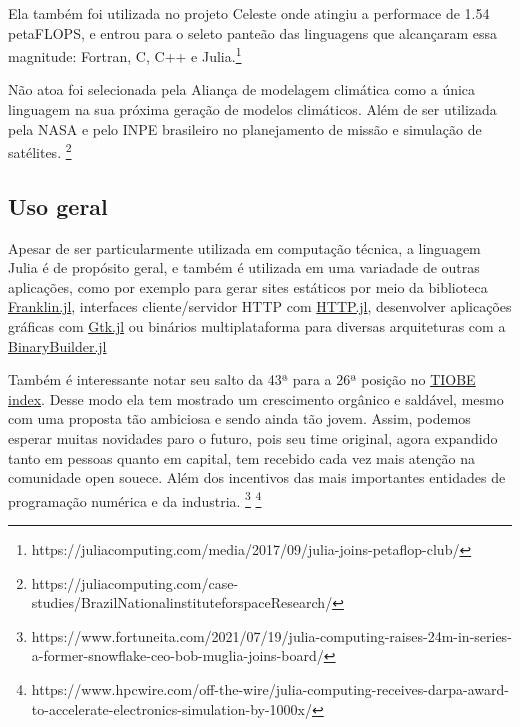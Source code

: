 Ela também foi utilizada no projeto Celeste onde atingiu a performace de 1.54 petaFLOPS, e entrou para o seleto panteão das linguagens que alcançaram essa magnitude: Fortran, C, C++ e Julia.\footnote{https://juliacomputing.com/media/2017/09/julia-joins-petaflop-club/}

Não atoa foi selecionada pela Aliança de modelagem climática como a única linguagem na sua próxima geração de modelos climáticos. Além de ser utilizada pela NASA e pelo INPE brasileiro no planejamento de missão e simulação de satélites. \footnote{https://juliacomputing.com/case-studies/BrazilNationalinstituteforspaceResearch/}



\subsection{Uso geral}

Apesar de ser particularmente utilizada em computação técnica, a linguagem Julia é de propósito geral, e também é utilizada em uma variadade de outras aplicações, como por exemplo para gerar sites estáticos por meio da biblioteca \href{http://franklinjl.org/)}{Franklin.jl}, interfaces cliente/servidor HTTP com \href{https://github.com/JuliaWeb/HTTP.jl}{HTTP.jl}, desenvolver aplicações gráficas com \href{https://github.com/JuliaGraphics/Gtk.jl}{Gtk.jl} ou binários multiplataforma para diversas arquiteturas com a \href{http://binarybuilder.org/}{BinaryBuilder.jl}

Também é interessante notar seu salto da 43ª para a 26ª posição no \href{https://www.tiobe.com/tiobe-index/}{TIOBE index}. 
Desse modo ela tem mostrado um crescimento orgânico e saldável, mesmo com uma proposta tão ambiciosa e sendo ainda tão jovem. Assim, podemos esperar muitas novidades paro o futuro, pois seu time original, agora expandido tanto em pessoas quanto em capital, tem recebido cada vez mais atenção na comunidade open souece. Além dos incentivos das mais importantes entidades de programação numérica e da industria. \footnote{https://www.fortuneita.com/2021/07/19/julia-computing-raises-24m-in-series-a-former-snowflake-ceo-bob-muglia-joins-board/} \footnote{https://www.hpcwire.com/off-the-wire/julia-computing-receives-darpa-award-to-accelerate-electronics-simulation-by-1000x/}




